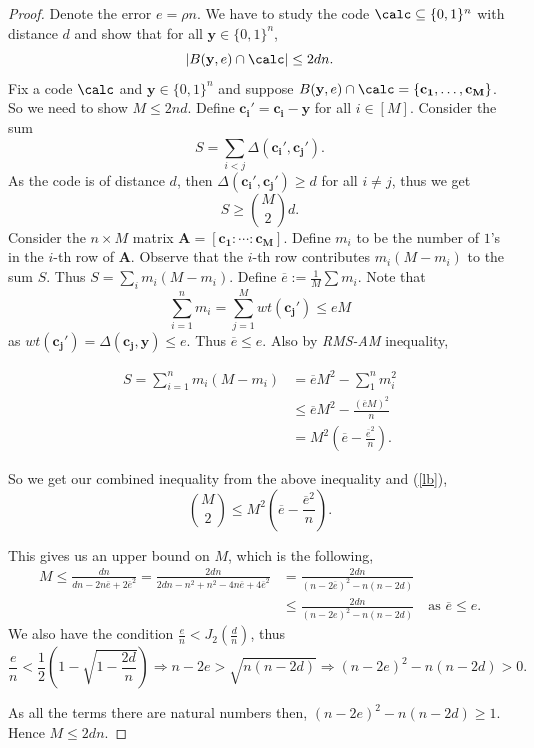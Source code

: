 	\begin{proof}
		Denote the error $e = \rho n$. We have to study the code $\calc\subseteq\{0,1\}^n$ with distance $d$ and show that for all $\mathbf{y}\in\{0,1\}^n$, 
		\[
		|B(\mathbf{y},e)\cap \calc| \leq 2dn.
		\]
		Fix a code $\calc$ and $\mathbf{y}\in\{0,1\}^n$ and suppose $B(\mathbf{y}, e)\cap\calc = \{\mathbf{c_1},\ldots,\mathbf{c_M}\}$. So we need to show $M\leq 2nd$. Define $\mathbf{c_i'} = \mathbf{c_i}-\mathbf{y}$ for all $i\in[M]$. Consider the sum 
		\[
		S = \sum_{i<j}\Delta(\mathbf{c_i'},\mathbf{c_j'}).
		\]
		As the code is of distance $d$, then $\Delta(\mathbf{c_i'},\mathbf{c_j'})\geq d$ for all $i\neq j$, thus we get
		\begin{equation}
			\label{lb}
			S \geq \binom{M}{2}d.
		\end{equation}
		Consider the $n\times M$ matrix $\mathbf{A} = [\mathbf{c_1} : \cdots : \mathbf{c_M}]$. Define $m_i$ to be the number of $1$'s in the $i$-th row of $\mathbf{A}$. Observe that the $i$-th row contributes $m_i(M-m_i)$ to the sum $S$. Thus $S = \sum_im_i(M-m_i)$.  Define $\overline{e} := \frac{1}{M}\sum m_i$. Note that 
		\[
		\sum_{i=1}^n m_i = \sum_{j=1}^M wt(\mathbf{c_j'}) \leq eM
		\]
		as $wt(\mathbf{c_j'}) = \Delta(\mathbf{c_j}, \mathbf{y}) \leq e$. Thus $\overline{e}\leq e$. Also by \emph{RMS-AM} inequality, 
		
		\begin{align*}
			S = \sum_{i=1}^n m_i(M-m_i) 
			& = \overline{e}M^2 - \sum_{1}^{n}m_i^2 \\
			& \leq \overline{e}M^2 - \frac{(\overline{e}M)^2}{n} \\
			&  = M^2(\overline{e} - \frac{\overline{e}^2}{n}).
		\end{align*}
		
		So we get our combined inequality from the above inequality and (\ref{lb}), 
		\[
		\binom{M}{2} \leq M^2(\overline{e} - \frac{\overline{e}^2}{n}).
		\]
		
		This gives us an upper bound on $M$, which is the following, 
		\begin{align*}
			M \leq \frac{dn}{dn - 2n\overline{e} + 2\overline{e}^2} = \frac{2dn}{2dn - n^2 + n^2 - 4n\overline{e} + 4\overline{e}^2} 
			& = \frac{2dn}{(n - 2\overline{e})^2 - n(n-2d)}\\
			& \leq \frac{2dn}{(n-2e)^2 - n(n-2d)} \quad \text{as $\overline{e} \leq e$}. 
		\end{align*}	
		We also have the condition $\frac{e}{n}<J_2(\frac{d}{n})$, thus 
		\[
		\frac{e}{n} < \frac{1}{2} \left( 1- \sqrt{1-\frac{2d}{n}} \right)
		\Rightarrow n-2e > \sqrt{n(n-2d)}
		\Rightarrow (n-2e)^2 - n(n-2d) > 0.
		\]
		
		As all the terms there are natural numbers then, $(n-2e)^2 - n(n-2d) \geq 1$. Hence $M\leq 2dn$.
		
	\end{proof}
	
